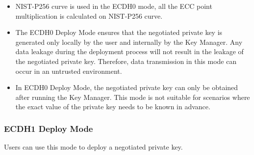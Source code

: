 \documentclass[main\_\_EN.tex]{subfiles}
\begin{document}
\vspace{-0.5em}
\begin{tiplisting}
\vspace{-2em}
\begin{itemize}
    \item NIST-P256 curve is used in the ECDH0 mode, all the ECC point multiplication is calculated on NIST-P256 curve.
    \item The ECDH0 Deploy Mode ensures that the negotiated private key is generated only locally by the user and internally by the Key Manager. Any data leakage during the deployment process will not result in the leakage of the negotiated private key. Therefore, data transmission in this mode can occur in an untrusted environment.
    \item In ECDH0 Deploy Mode, the negotiated private key can only be obtained after running the Key Manager. This mode is not suitable for scenarios where the exact value of the private key needs to be known in advance.
\end{itemize}
\end{tiplisting}

\subsubsection{ECDH1 Deploy Mode}
Users can use this mode to deploy a negotiated private key.
\end{document}
